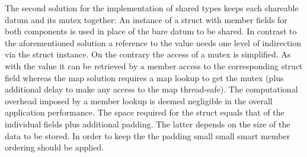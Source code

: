 The second solution for the implementation of shared types keeps each shareable datum and its mutex together: An instance of a struct with member fields for both components is used in place of the bare datum to be shared. In contrast to the aforementioned solution a reference to the value  needs one level of indirection via the struct instance. On the contrary the access of a mutex is simplified. As with the value it can be retrieved by a member access to the corresponding struct field whereas the map solution requires a map lookup to get the mutex (plus additional delay to make any access to the map thread-safe). The computational overhead imposed by a member lookup is deemed negligible in the overall application performance. The space required for the struct equals that of the individual fields plus additional padding\cite[pp.~303 ff.]{LinuxSystemProgramming}. The latter depends on the size of the data to be stored. In order to keep the the padding small small smart member ordering should be applied. 

